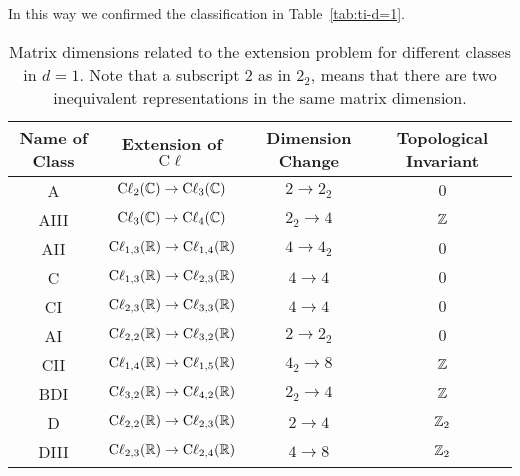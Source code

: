 \documentclass{article}
\begin{document}
In this way we confirmed the classification in Table~\ref{tab:ti-d=1}.

\begin{table}[htpb]
    \centering
    \caption{Matrix dimensions related to the extension problem for different
    classes in $d=1$. Note that a subscript $2$ as in $2_2$, means that there
    are two inequivalent representations in the same matrix dimension.}
    \label{tab:mat-dim-allClass-1d}
    \begin{tabular}{c | c c c}
        Name of Class & Extension of $\mathrm{C\ell}$ & Dimension Change &
        Topological Invariant \\
        \hline
        A & $\mathrm{C\ell}_{2}(\mathbb{C})\to\mathrm{C\ell}_{3}(\mathbb{C})$ & $2\to2_2$ & $0$
        \\
        AIII & $\mathrm{C\ell}_{3}(\mathbb{C})\to\mathrm{C\ell}_{4}(\mathbb{C})$ & $2_2\to4$ &
        $\mathbb{Z}$
        \\
        AII & $\mathrm{C\ell}_{1,3}(\mathbb{R})\to\mathrm{C\ell}_{1,4}(\mathbb{R})$ & $4\to 4_2$ & $0$
        \\
        C & $\mathrm{C\ell}_{1,3}(\mathbb{R})\to\mathrm{C\ell}_{2,3}(\mathbb{R})$ & $4\to 4$ & $0$
        \\
        CI & $\mathrm{C\ell}_{2,3}(\mathbb{R})\to\mathrm{C\ell}_{3,3}(\mathbb{R})$ & $4\to 4$ & $0$
        \\
        AI & $\mathrm{C\ell}_{2,2}(\mathbb{R})\to\mathrm{C\ell}_{3,2}(\mathbb{R})$ & $2\to 2_2$ & $0$
        \\
        CII & $\mathrm{C\ell}_{1,4}(\mathbb{R})\to\mathrm{C\ell}_{1,5}(\mathbb{R})$ & $4_2\to 8$
        & $\mathbb{Z}$
        \\
        BDI & $\mathrm{C\ell}_{3,2}(\mathbb{R})\to\mathrm{C\ell}_{4,2}(\mathbb{R})$ & $2_2\to 4$ 
        & $\mathbb{Z}$
        \\
        D & $\mathrm{C\ell}_{2,2}(\mathbb{R})\to\mathrm{C\ell}_{2,3}(\mathbb{R})$ & $2\to 4$ 
        & $\mathbb{Z}_2$
        \\
        DIII & $\mathrm{C\ell}_{2,3}(\mathbb{R})\to\mathrm{C\ell}_{2,4}(\mathbb{R})$ & $4\to 8$ 
        & $\mathbb{Z}_2$
        \\
        \hline
    \end{tabular}
\end{table}
\end{document}
